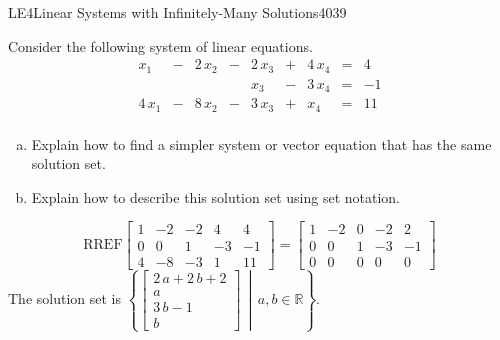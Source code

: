 \begin{exercise}{LE4}{Linear Systems with Infinitely-Many Solutions}{4039} 
\begin{exerciseStatement} 

 Consider the following system of linear equations. \[
        \begin{matrix}
 x_{1} &  -  & 2 \, x_{2} &  -  & 2 \, x_{3} &  +  & 4 \, x_{4} & = & 4 \\
 &  &  &  & x_{3} &  -  & 3 \, x_{4} & = & -1 \\
 4 \, x_{1} &  -  & 8 \, x_{2} &  -  & 3 \, x_{3} &  +  & x_{4} & = & 11 \\
 \end{matrix}      
      \] 

 

\begin{enumerate}[(a)]
\item  

 Explain how to find a simpler system or vector equation that has the same solution set. 

 
\item  

 Explain how to describe this solution set using set notation. 

 
\end{enumerate}

     \end{exerciseStatement}
 \begin{exerciseAnswer} 

 \[\mathrm{RREF}\left[\begin{array}{cccc|c}
1 & -2 & -2 & 4 & 4 \\
0 & 0 & 1 & -3 & -1 \\
4 & -8 & -3 & 1 & 11
\end{array}\right]=\left[\begin{array}{cccc|c}
1 & -2 & 0 & -2 & 2 \\
0 & 0 & 1 & -3 & -1 \\
0 & 0 & 0 & 0 & 0
\end{array}\right]\] The solution set is \( \left\{ \left[\begin{array}{c}
2 \, a + 2 \, b + 2 \\
a \\
3 \, b - 1 \\
b
\end{array}\right] \,\middle|\, a,b \in\mathbb R \right\} \). 

 \end{exerciseAnswer}
 \end{exercise}


